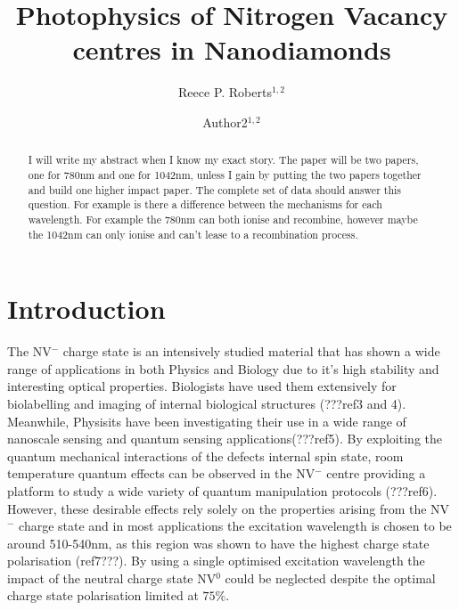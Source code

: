 \documentclass[preprint,prl,twocolumn]{revtex4}
\begin{document}
\title{Photophysics of Nitrogen Vacancy centres in Nanodiamonds}
  
\author{Reece P. Roberts$^{1,2}$}
\author{Author2$^{1,2}$}



\begin{abstract}
I will write my abstract when I know my exact story.
The paper will be two papers, one for 780nm and one for 1042nm, unless I gain by putting the two papers together and build one higher impact paper.
The complete set of data should answer this question.
For example is there a difference between the mechanisms for each wavelength. For example the 780nm can both ionise and recombine, however maybe the 1042nm can only ionise and can't lease to a recombination process.
\end{abstract}

\maketitle

\section{Introduction}
The NV$^-$ charge state is an intensively studied material that has shown a wide range of applications in both Physics and Biology due to it's high stability and interesting optical properties. Biologists have used them extensively for biolabelling and imaging of internal biological structures (???ref3 and 4). Meanwhile, Physisits have been investigating their use in a wide range of nanoscale sensing and quantum sensing applications(???ref5). By exploiting the quantum mechanical interactions of the defects internal spin state, room temperature quantum effects can be observed in the NV$^-$ centre providing a platform to study a wide variety of quantum manipulation protocols (???ref6). However, these desirable effects rely solely on the properties arising from the NV$^-$ charge state and in most applications the excitation wavelength is chosen to be around 510-540nm, as this region was shown to have the highest charge state polarisation (ref7???). By using a single optimised excitation wavelength the impact of the neutral charge state NV$^0$ could be neglected despite the optimal charge state polarisation limited at $75\%$. 
\end{document}
